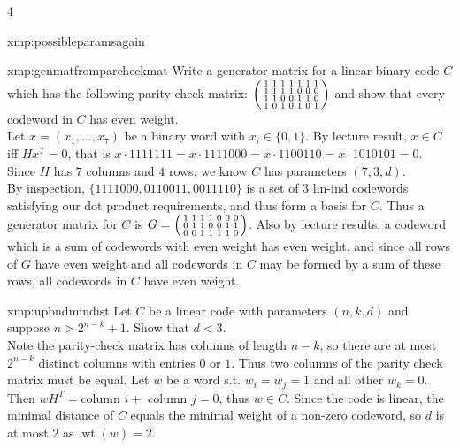 \documentclass[landscape, 8pt]{extarticle}
\DeclareMathOperator{\wt}{wt}
\begin{document}
\begin{multicols*}{4}
\begin{xmp}{xmp:possibleparamsagain}{ }
		\end{xmp}
		
		
		\begin{xmp-s}{xmp:genmatfromparcheckmat}{ }
		Write a generator matrix for a linear binary code $C$ which has the following parity check matrix:
		$
		\begin{psmallmatrix*}
			1&1&1&1&1&1&1\\
			1&1&1&1&0&0&0\\
			1&1&0&0&1&1&0\\
			1&0&1&0&1&0&1
		\end{psmallmatrix*}
		$
		and show that every codeword in $C$ has even weight.\\
		Let $x = (x_1, \dots, x_7)$ be a binary word with $x_i\in\{0, 1\}$. By lecture result, $x\in C$ iff $Hx^T = 0$, that is $x \cdot  1111111 = x\cdot 1111000 = x\cdot 1100110 = x\cdot 1010101 = 0$. Since $H$ has $7$ columns and $4$ rows, we know $C$ has parameters $(7, 3, d)$. \\
		By inspection, $\{1111000, 0110011, 0011110\}$ is a set of $3$ lin-ind codewords satisfying our dot product requirements, and thus form a basis for $C$. Thus a generator matrix for $C$ is 
		$ G= 
		\begin{psmallmatrix*}
			1&1&1&1&0&0&0\\
			0&1&1&0&0&1&1\\
			0&0&1&1&1&1&0
		\end{psmallmatrix*}
		$.
		Also by lecture results, a codeword which is a sum of codewords with even weight has even weight, and since all rows of $G$ have even weight and all codewords in $C$ may be formed by a sum of these rows, all codewords in $C$ have even weight.
		
		\end{xmp-s}
		
		
		\begin{xmp}{xmp:upbndmindist}{ }
		Let $C$ be a linear code with parameters $(n, k, d)$ and suppose $n>2^{n-k} + 1$. Show that $d <3$.\\
		Note the parity-check matrix has columns of length $n-k$, so there are at most $2^{n-k}$ distinct columns with entries $0$ or $1$. Thus two columns of the parity check matrix must be equal. Let $w$ be a word s.t. $w_i = w_j = 1$ and all other $w_k = 0$. Then $wH^T = $column $i +$ column $j = 0$, thus $w\in C$. Since the code is linear, the minimal distance of $C$ equals the minimal weight of a non-zero codeword, so $d$ is at most $2$ as $\wt(w) = 2$.
		

\end{xmp}
\end{multicols*}
\end{document}
